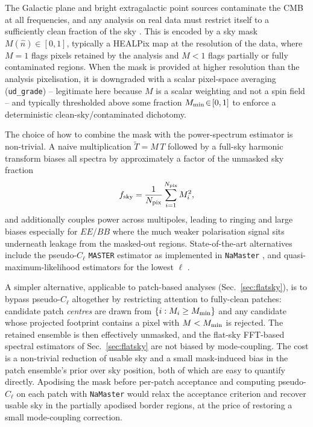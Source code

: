 \documentclass[11pt]{article}
\theoremstyle{definition}
\begin{document}
The Galactic plane and bright extragalactic point sources contaminate the CMB at all frequencies, and any analysis on real data must restrict itself to a sufficiently clean fraction of the sky \cite{planck2018overview,sullivan2024methods}. This is encoded by a sky mask $M(\hat n)\in[0,1]$, typically a HEALPix map at the resolution of the data, where $M=1$ flags pixels retained by the analysis and $M<1$ flags partially or fully contaminated regions. When the mask is provided at higher resolution than the analysis pixelisation, it is downgraded with a scalar pixel-space averaging (\texttt{ud\_grade}) -- legitimate here because $M$ is a scalar weighting and not a spin field -- and typically thresholded above some fraction $M_{\rm min}\!\in\![0,1]$ to enforce a deterministic clean-sky/contaminated dichotomy.

The choice of how to combine the mask with the power-spectrum estimator is non-trivial. A naive multiplication \(\tilde T = M\,T\) followed by a full-sky harmonic transform biases all spectra by approximately a factor of the unmasked sky fraction
\begin{equation}
  f_{\rm sky}
  = \frac{1}{N_{\rm pix}}\sum_{i=1}^{N_{\rm pix}} M_i^2,
\end{equation}
and additionally couples power across multipoles, leading to ringing and large biases especially for \(EE\)/\(BB\) where the much weaker polarisation signal sits underneath leakage from the masked-out regions. State-of-the-art alternatives include the pseudo-\(C_\ell\) \texttt{MASTER} estimator \cite{hivon2002master} as implemented in \texttt{NaMaster} \cite{alonso2023namaster}, and quasi-maximum-likelihood estimators for the lowest \(\ell\) \cite{sullivan2024methods}.

A simpler alternative, applicable to patch-based analyses (Sec.~\ref{sec:flatsky}), is to bypass pseudo-\(C_\ell\) altogether by restricting attention to fully-clean patches: candidate patch \emph{centres} are drawn from $\{i:M_i\geq M_{\rm min}\}$ and any candidate whose projected footprint contains a pixel with $M<M_{\rm min}$ is rejected. The retained ensemble is then effectively unmasked, and the flat-sky FFT-based spectral estimators of Sec.~\ref{sec:flatsky} are not biased by mode-coupling. The cost is a non-trivial reduction of usable sky and a small mask-induced bias in the patch ensemble's prior over sky position, both of which are easy to quantify directly. Apodising the mask before per-patch acceptance and computing pseudo-\(C_\ell\) on each patch with \texttt{NaMaster} \cite{alonso2023namaster} would relax the acceptance criterion and recover usable sky in the partially apodised border regions, at the price of restoring a small mode-coupling correction.
\end{document}
